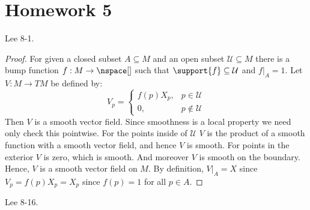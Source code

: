 \section{Homework 5}
    \begin{problem}
        Lee 8-1.
    \end{problem}
    \begin{proof}
        For given a closed subset $A\subseteq{M}$ and an open subset
        $\mathcal{U}\subseteq{M}$ there is a bump function
        $f:M\rightarrow\nspace[]$ such that
        $\support{f}\subseteq\mathcal{U}$ and $f|_{A}=1$. Let
        $V:M\rightarrow{TM}$ be defined by:
        \begin{equation}
            V_{p}=
            \begin{cases}
                f(p)X_{p},&p\in\mathcal{U}\\
                0,&p\notin\mathcal{U}
            \end{cases}
        \end{equation}
        Then $V$ is a smooth vector field. Since smoothness is a local
        property we need only check this pointwise. For the points inside
        of $\mathcal{U}$ $V$ is the product of a smooth function with a
        smooth vector field, and hence $V$ is smooth. For points in the
        exterior $V$ is zero, which is smooth. And moreover $V$ is smooth on
        the boundary. Hence, $V$ is a smooth vector field on $M$. By
        definition, $V|_{A}=X$ since $V_{p}=f(p)X_{p}=X_{p}$ since
        $f(p)=1$ for all $p\in{A}$.
    \end{proof}
    \begin{problem}
        Lee 8-16.
    \end{problem}
